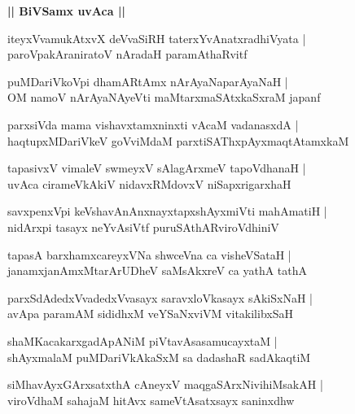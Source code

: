 \documentclass[twoside,12pt,openright]{book}
\newcounter{shloka}[chapter]
\def\uvaca#1{\centerline{{\large\textbf{#1}}}}
\begin{document}
\uvaca{|| BiVSamx uvAca ||}

\begin{shloka}%
iteyxVvamukAtxvX deVvaSiRH taterxYvAnatxradhiVyata |\\
paroVpakAraniratoV nAradaH paramAthaRvitf 
\end{shloka}

\begin{shloka}%
puMDariVkoVpi dhamARtAmx nArAyaNaparAyaNaH |\\
OM namoV nArAyaNAyeVti maMtarxmaSAtxkaSxraM japanf
\end{shloka}

\begin{shloka}%
parxsiVda mama vishavxtamxninxti vAcaM vadanasxdA |\\
haqtupxMDariVkeV goVviMdaM parxtiSAThxpAyxmaqtAtamxkaM 
\end{shloka}

\begin{shloka}%
tapasivxV vimaleV swmeyxV sAlagArxmeV tapoVdhanaH |\\
uvAca cirameVkAkiV nidavxRMdovxV niSapxrigarxhaH
\end{shloka}

\begin{shloka}%
savxpenxVpi keVshavAnAnxnayxtapxshAyxmiVti mahAmatiH |\\
nidArxpi tasayx neYvAsiVtf puruSAthARviroVdhiniV
\end{shloka}

\begin{shloka}%
tapasA barxhamxcareyxVNa shwceVna ca visheVSataH |\\
janamxjanAmxMtarArUDheV saMsAkxreV ca yathA tathA 
\end{shloka}

\begin{shloka}%
parxSdAdedxVvadedxVvasayx saravxloVkasayx sAkiSxNaH |\\
avApa paramAM sididhxM veYSaNxviVM vitakilibxSaH
\end{shloka}

\begin{shloka}%
shaMKacakarxgadApANiM piVtavAsasamucayxtaM |\\
shAyxmalaM puMDariVkAkaSxM sa dadashaR sadAkaqtiM 
\end{shloka}

\begin{shloka}%
siMhavAyxGArxsatxthA cAneyxV maqgaSArxNivihiMsakAH |\\
viroVdhaM sahajaM hitAvx sameVtAsatxsayx saninxdhw
\end{shloka}
\end{document}
